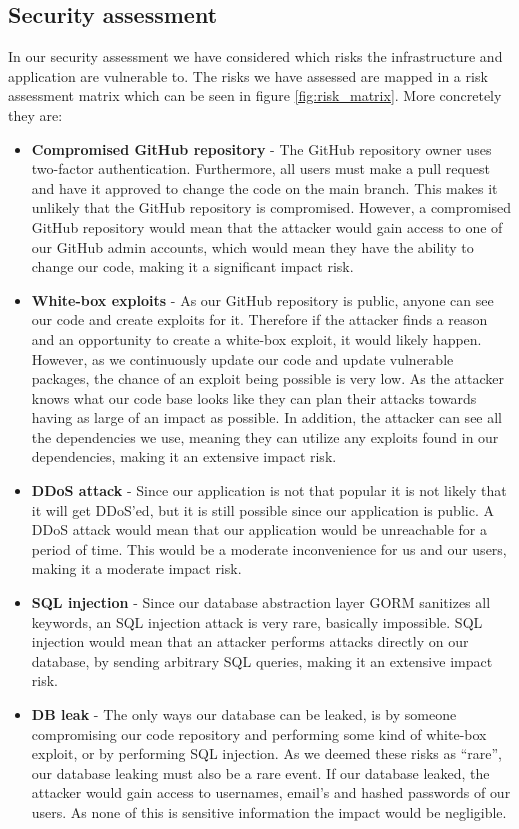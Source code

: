 \subsection{Security assessment}
In our security assessment we have considered which risks the infrastructure and application are vulnerable to. The risks we have assessed are mapped in a risk assessment matrix which can be seen in figure \ref{fig:risk_matrix}. More concretely they are:
\begin{itemize}
    \item \textbf{Compromised GitHub repository} - The GitHub repository owner uses two-factor authentication. Furthermore, all users must make a pull request and have it approved to change the code on the main branch. This makes it unlikely that the GitHub repository is compromised. However, a compromised GitHub repository would mean that the attacker would gain access to one of our GitHub admin accounts, which would mean they have the ability to change our code, making it a significant impact risk.
    \item \textbf{White-box exploits} - As our GitHub repository is public, anyone can see our code and create exploits for it. Therefore if the attacker finds a reason and an opportunity to create a white-box exploit, it would likely happen. However, as we continuously update our code and update vulnerable packages, the chance of an exploit being possible is very low. As the attacker knows what our code base looks like they can plan their attacks towards having as large of an impact as possible. In addition, the attacker can see all the dependencies we use, meaning they can utilize any exploits found in our dependencies, making it an extensive impact risk.
    \item \textbf{DDoS attack} - Since our application is not that popular it is not likely that it will get DDoS’ed, but it is still possible since our application is public. A DDoS attack would mean that our application would be unreachable for a period of time. This would be a moderate inconvenience for us and our users, making it a moderate impact risk.
    \item \textbf{SQL injection} - Since our database abstraction layer GORM sanitizes all keywords, an SQL injection attack is very rare, basically impossible. SQL injection would mean that an attacker performs attacks directly on our database, by sending arbitrary SQL queries, making it an extensive impact risk.
    \item \textbf{DB leak} - The only ways our database can be leaked, is by someone compromising our code repository and performing some kind of white-box exploit, or by performing SQL injection. As we deemed these risks as “rare”, our database leaking must also be a rare event. If our database leaked, the attacker would gain access to usernames, email’s and hashed passwords of our users. As none of this is sensitive information the impact would be negligible.
\end{itemize}

